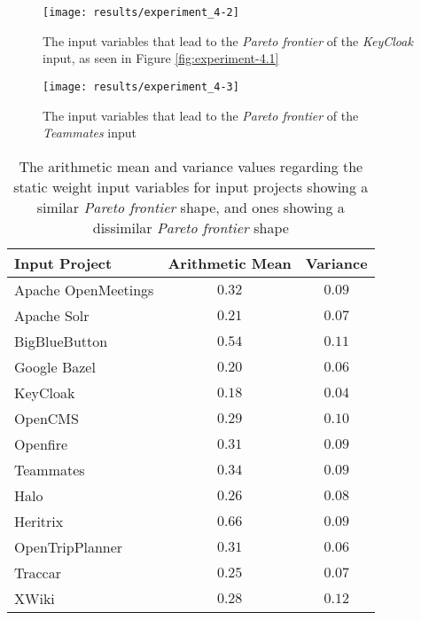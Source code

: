 \documentclass[12pt,a4paper]{report}
\begin{document}
\begin{figure}[htbp]
\centering
\texttt{[image: results/experiment\_4-2]}
\caption{The input variables that lead to the \textit{Pareto frontier} of the \textit{KeyCloak} input, as seen in Figure \ref{fig:experiment-4.1}}
\label{fig:experiment-4.2}
\end{figure}

\begin{figure}[htbp]
\centering
\texttt{[image: results/experiment\_4-3]}
\caption{The input variables that lead to the \textit{Pareto frontier} of the \textit{Teammates} input}
\label{fig:experiment-4.3}
\end{figure}

\begin{table}[h!]
\def\arraystretch{1.55}
\begin{tabularx}{\textwidth}{|X|c|c|}
\hline
Input Project & Arithmetic Mean & Variance \\
\hline\hline

Apache OpenMeetings & $0.32$ & $0.09$ \\\hline
Apache Solr         & $0.21$ & $0.07$ \\\hline
BigBlueButton       & $0.54$ & $0.11$ \\\hline
Google Bazel        & $0.20$ & $0.06$ \\\hline
KeyCloak            & $0.18$ & $0.04$ \\\hline
OpenCMS             & $0.29$ & $0.10$ \\\hline
Openfire            & $0.31$ & $0.09$ \\\hline
Teammates           & $0.34$ & $0.09$ \\\hline
\hline\hline
Halo                & $0.26$ & $0.08$ \\\hline
Heritrix            & $0.66$ & $0.09$ \\\hline
OpenTripPlanner     & $0.31$ & $0.06$ \\\hline
Traccar             & $0.25$ & $0.07$ \\\hline
XWiki               & $0.28$ & $0.12$ \\\hline

\end{tabularx}
\caption{The arithmetic mean and variance values regarding the static weight input variables for input projects showing a similar \textit{Pareto frontier} shape, and ones showing a dissimilar \textit{Pareto frontier} shape}
\label{table:experiment-4.4}
\end{table}
\end{document}
